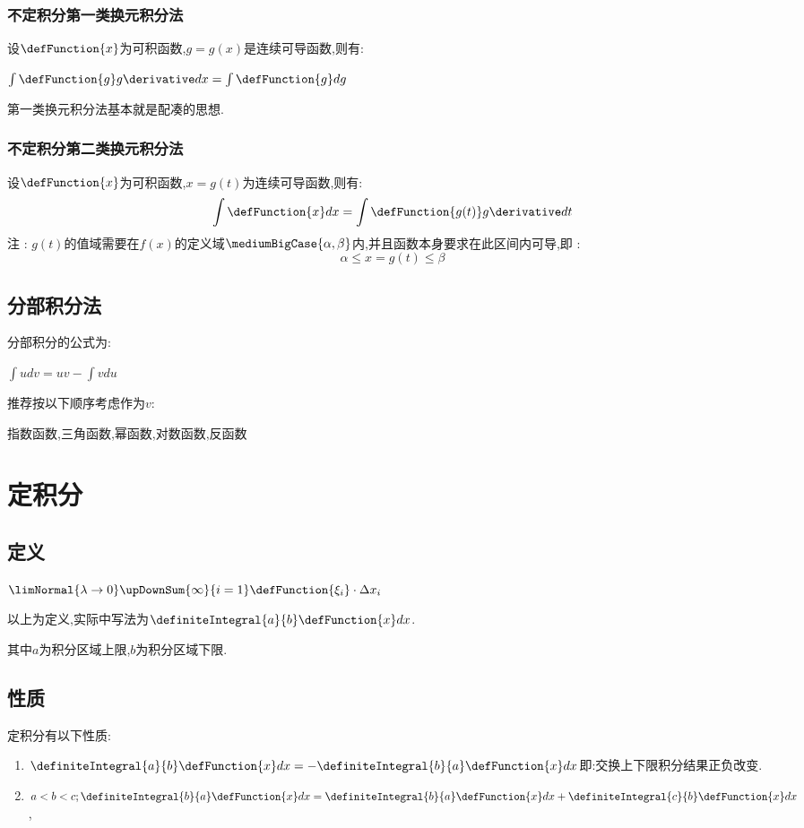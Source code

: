 {{{    \subsubsection{不定积分第一类换元积分法}{
      设$\defFunction{x}$为可积函数,$g = g(x)$是连续可导函数,则有:

      $\int \defFunction{g}g\derivative dx = \int \defFunction{g}dg$

      第一类换元积分法基本就是配凑的思想.

    }%

    \subsubsection{不定积分第二类换元积分法}{
      设$\defFunction{x}$为可积函数,$x = g(t)$为连续可导函数,则有:$$
        \int \defFunction{x}dx = \int \defFunction{g(t)}g\derivative dt
      $$
      注 : $g(t)$的值域需要在$f(x)$的定义域$\mediumBigCase{\alpha,\beta}$内,并且函数本身要求在此区间内可导,即 : $$
        \alpha \leq x = g(t) \leq \beta
      $$
    }%
  }%

  \subsection{分部积分法}{
    分部积分的公式为:

    $\int udv = uv - \int v du$

    推荐按以下顺序考虑作为$v$:

    指数函数,三角函数,幂函数,对数函数,反函数
  }%

 }%

\section{定积分}{

\subsection{定义}{
  $\limNormal{\lambda \to 0}\upDownSum{\infty}{i = 1}\defFunction{\xi_i}\cdot\Delta x_i$

  以上为定义,实际中写法为$\definiteIntegral{a}{b}\defFunction{x}dx$.

  其中$a$为积分区域上限,$b$为积分区域下限.
}%

\subsection{性质}{
  定积分有以下性质:
  \begin{enumerate}
    \item $\definiteIntegral{a}{b}\defFunction{x}dx = -\definiteIntegral{b}{a}\defFunction{x}dx$即:交换上下限积分结果正负改变.
    \item {
          $a < b < c; \definiteIntegral{b}{a}\defFunction{x}dx = \definiteIntegral{b}{a}\defFunction{x}dx + \definiteIntegral{c}{b}\defFunction{x}dx$,

}
\end{enumerate}}}}
